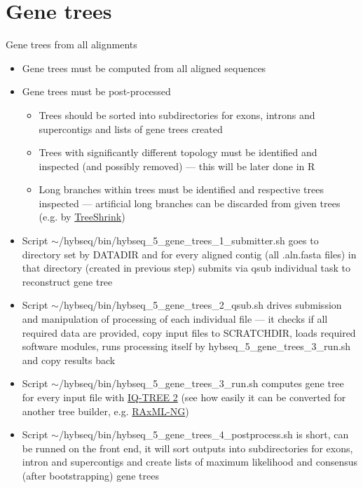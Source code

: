\documentclass[compress, ucs, xelatex, 11pt, xcolor=x11names, aspectratio=169,
	hyperref={
		bookmarks=true,
		unicode=true,
		colorlinks=true,
		pdftitle={HybSeq course},
		plainpages=false,
		pdfauthor={Vojtech Zeisek},
		pdfsubject={Practical processing of HybSeq target enrichment sequencing data on computing grids like MetaCentrum},
		pdfcreator={XeLaTeX},
		pdfkeywords={BASH, command line, GNU, HybSeq, Linux, MetaCentrum, sequencing shell, target enrichment},
		linkcolor=Turquoise4, %
		anchorcolor=DodgerBlue4, %
		citecolor=DodgerBlue4, %
		filecolor=DodgerBlue4, %
		menucolor=Tan4, %
		urlcolor=DarkOliveGreen4, %
		pdftex},
	url={hyphens, lowtilde} %
	]{beamer}
\renewcommand{\texttt}[1]{\colorbox{Cornsilk2}{{\ttfamily #1}}}
\begin{document}
\section{Gene trees}

\begin{frame}[allowframebreaks]{Gene trees from all alignments}
	\begin{itemize}
		\item Gene trees must be computed from all aligned sequences
		\item Gene trees must be post-processed
		\begin{itemize}
			\item Trees should be sorted into subdirectories for exons, introns and supercontigs and lists of gene trees created
			\item Trees with significantly different topology must be identified and inspected (and possibly removed) --- this will be later done in \texttt{R}
			\item Long branches within trees must be identified and respective trees inspected --- artificial long branches can be discarded from given trees (e.g. by \href{https://github.com/uym2/TreeShrink}{TreeShrink})
		\end{itemize}
		\item Script \texttt{$\sim$/hybseq/bin/hybseq\_5\_gene\_trees\_1\_submitter.sh} goes to directory set by \texttt{DATADIR} and for every aligned contig (all \texttt{*.aln.fasta} files) in that directory (created in previous step) submits via \texttt{qsub} individual task to reconstruct gene tree
		\item Script \texttt{$\sim$/hybseq/bin/hybseq\_5\_gene\_trees\_2\_qsub.sh} drives submission and manipulation of processing of each individual file --- it checks if all required data are provided, copy input files to \texttt{SCRATCHDIR}, loads required software modules, runs processing itself by \texttt{hybseq\_5\_gene\_trees\_3\_run.sh} and copy results back
		\item Script \texttt{$\sim$/hybseq/bin/hybseq\_5\_gene\_trees\_3\_run.sh} computes gene tree for every input file with \href{http://www.iqtree.org/}{IQ-TREE 2} (see how easily it can be converted for another tree builder, e.g. \href{https://github.com/amkozlov/raxml-ng}{RAxML-NG})
		\item Script \texttt{$\sim$/hybseq/bin/hybseq\_5\_gene\_trees\_4\_postprocess.sh} is short, can be runned on the front end, it will sort outputs into subdirectories for exons, intron and supercontigs and create lists of maximum likelihood and consensus (after bootstrapping) gene trees
	\end{itemize}
\end{frame}
\end{document}
